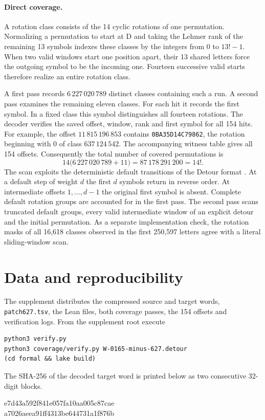 \documentclass[11pt]{article}
\begin{document}
\paragraph{Direct coverage.}
A rotation class consists of the 14 cyclic rotations of one permutation. Normalizing a permutation to start at \(\mathrm D\) and taking the Lehmer rank of the remaining 13 symbols indexes these classes by the integers from \(0\) to \(13!-1\). When two valid windows start one position apart, their 13 shared letters force the outgoing symbol to be the incoming one. Fourteen successive valid starts therefore realize an entire rotation class.

A first pass records \(6\,227\,020\,789\) distinct classes containing such a run. A second pass examines the remaining eleven classes. For each hit it records the first symbol. In a fixed class this symbol distinguishes all fourteen rotations. The decoder verifies the saved offset, window, rank and first symbol for all 154 hits. For example, the offset \(11\,815\,196\,853\) contains \texttt{0BA35D14C79862}, the rotation beginning with 0 of class \(637\,124\,542\). The accompanying witness table gives all 154 offsets. Consequently the total number of covered permutations is
\[
 14\bigl(6\,227\,020\,789+11\bigr)=87\,178\,291\,200=14! .
\]
The scan exploits the deterministic default transitions of the Detour format \cite{format}. At a default step of weight \(d\) the first \(d\) symbols return in reverse order. At intermediate offsets \(1,\ldots,d-1\) the original first symbol is absent. Complete default rotation groups are accounted for in the first pass. The second pass scans truncated default groups, every valid intermediate window of an explicit detour and the initial permutation. As a separate implementation check, the rotation masks of all 16,618 classes observed in the first 250,597 letters agree with a literal sliding-window scan.

\clearpage
\section{Data and reproducibility}
The supplement distributes the compressed source and target words, \texttt{patch627.tsv}, the Lean files, both coverage passes, the 154 offsets and verification logs. From the supplement root execute
\begin{verbatim}
python3 verify.py
python3 coverage/verify.py W-0165-minus-627.detour
(cd formal && lake build)
\end{verbatim}
The SHA-256 of the decoded target word is printed below as two consecutive 32-digit blocks.
\begin{center}\small\ttfamily
e7d43a592f841e057fa10aa005c87cae\\[-1pt]
a7026aeea91ff4313be644731a1f876b
\end{center}
\end{document}
